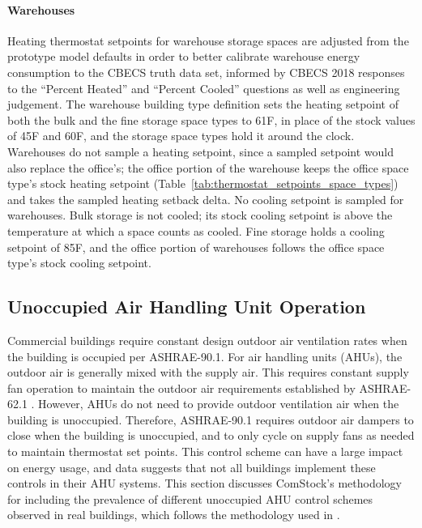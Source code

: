 \paragraph{Warehouses}

Heating thermostat setpoints for warehouse storage spaces are adjusted from the prototype model defaults in order to better calibrate warehouse energy consumption to the CBECS truth data set, informed by CBECS 2018 \citep{eia2018cbecs} responses to the ``Percent Heated'' and ``Percent Cooled'' questions as well as engineering judgement. The warehouse building type definition sets the heating setpoint of both the bulk and the fine storage space types to 61\textdegree F, in place of the stock values of 45\textdegree F and 60\textdegree F, and the storage space types hold it around the clock. Warehouses do not sample a heating setpoint, since a sampled setpoint would also replace the office's; the office portion of the warehouse keeps the office space type's stock heating setpoint (Table~\ref{tab:thermostat_setpoints_space_types}) and takes the sampled heating setback delta. No cooling setpoint is sampled for warehouses. Bulk storage is not cooled; its stock cooling setpoint is above the temperature at which a space counts as cooled. Fine storage holds a cooling setpoint of 85\textdegree F, and the office portion of warehouses follows the office space type's stock cooling setpoint.

\pagebreak
\subsection{Unoccupied Air Handling Unit Operation}
\label{sec:unoccupied_ahu_operation}

Commercial buildings require constant design outdoor air ventilation rates when the building is occupied per ASHRAE-90.1. For air handling units (AHUs), the outdoor air is generally mixed with the supply air. This requires constant supply fan operation to maintain the outdoor air requirements established by ASHRAE-62.1 \citep{ashrae_62.1_2004}. However, AHUs do not need to provide outdoor ventilation air when the building is unoccupied. Therefore, ASHRAE-90.1 requires outdoor air dampers to close when the building is unoccupied, and to only cycle on supply fans as needed to maintain thermostat set points. This control scheme can have a large impact on energy usage, and data suggests that not all buildings implement these controls in their AHU systems. This section discusses ComStock's methodology for including the prevalence of different unoccupied AHU control schemes observed in real buildings, which follows the methodology used in \cite{unocc_hvac_paper}.

